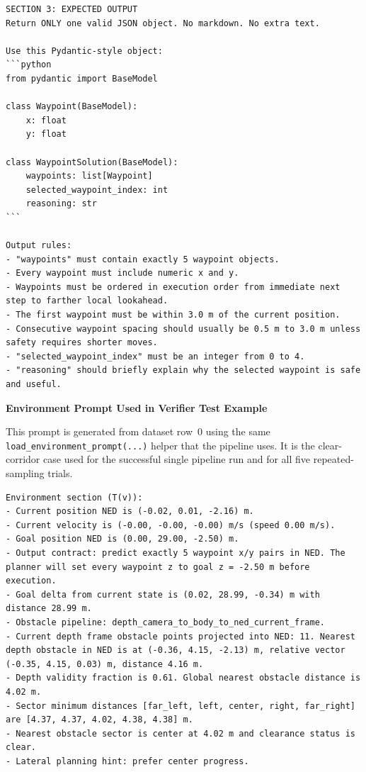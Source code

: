 \documentclass[12pt]{article}
\begin{document}
\begin{lstlisting}[style=textcode,caption={assignment2 fixed prompt used for the API pipeline}]
SECTION 3: EXPECTED OUTPUT
Return ONLY one valid JSON object. No markdown. No extra text.

Use this Pydantic-style object:
```python
from pydantic import BaseModel

class Waypoint(BaseModel):
    x: float
    y: float

class WaypointSolution(BaseModel):
    waypoints: list[Waypoint]
    selected_waypoint_index: int
    reasoning: str
```

Output rules:
- "waypoints" must contain exactly 5 waypoint objects.
- Every waypoint must include numeric x and y.
- Waypoints must be ordered in execution order from immediate next step to farther local lookahead.
- The first waypoint must be within 3.0 m of the current position.
- Consecutive waypoint spacing should usually be 0.5 m to 3.0 m unless safety requires shorter moves.
- "selected_waypoint_index" must be an integer from 0 to 4.
- "reasoning" should briefly explain why the selected waypoint is safe and useful.
\end{lstlisting}

\bigskip
\noindent\textbf{Environment Prompt Used in Verifier Test Example}

\medskip
\noindent This prompt is generated from dataset row~0 using the same
\texttt{load\_environment\_prompt(...)} helper that the pipeline uses. It is the clear-corridor
case used for the successful single pipeline run and for all five repeated-sampling trials.

\begin{lstlisting}[style=textcode,caption={Dataset prompt used in the local verifier example}]
Environment section (T(v)):
- Current position NED is (-0.02, 0.01, -2.16) m.
- Current velocity is (-0.00, -0.00, -0.00) m/s (speed 0.00 m/s).
- Goal position NED is (0.00, 29.00, -2.50) m.
- Output contract: predict exactly 5 waypoint x/y pairs in NED. The planner will set every waypoint z to goal z = -2.50 m before execution.
- Goal delta from current state is (0.02, 28.99, -0.34) m with distance 28.99 m.
- Obstacle pipeline: depth_camera_to_body_to_ned_current_frame.
- Current depth frame obstacle points projected into NED: 11. Nearest depth obstacle in NED is at (-0.36, 4.15, -2.13) m, relative vector (-0.35, 4.15, 0.03) m, distance 4.16 m.
- Depth validity fraction is 0.61. Global nearest obstacle distance is 4.02 m.
- Sector minimum distances [far_left, left, center, right, far_right] are [4.37, 4.37, 4.02, 4.38, 4.38] m.
- Nearest obstacle sector is center at 4.02 m and clearance status is clear.
- Lateral planning hint: prefer center progress.
\end{lstlisting}
\end{document}
